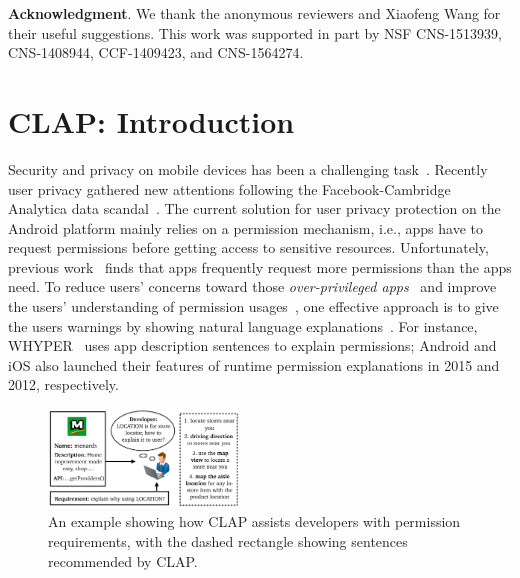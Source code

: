 \noindent \textbf{Acknowledgment}. We thank the anonymous reviewers and Xiaofeng Wang for their useful suggestions. This work was supported in part by NSF CNS-1513939, CNS-1408944,  CCF-1409423, and CNS-1564274. 


\section{CLAP: Introduction}
\label{sec:intro}

Security and privacy on mobile devices has been a challenging task~\cite{journals/tocs/EnckGHTCCJMS14,conf/ccs/FeltCHSW11,conf/soups/FeltHEHCW12,conf/huc/LinSALHZ12,conf/soups/LinLSH14,yang2015appcontext}. Recently user privacy gathered new attentions following the Facebook-Cambridge Analytica data scandal~\cite{facebookleak}. The current solution for user privacy protection on the Android platform mainly relies on a permission mechanism, i.e., apps have to request permissions before getting access to sensitive resources. 
Unfortunately, previous work~\cite{conf/ccs/FeltCHSW11} finds that apps frequently request more permissions than the apps need. 
To reduce users' concerns toward those \emph{over-privileged apps}~\cite{conf/ccs/FeltCHSW11,journals/tocs/EnckGHTCCJMS14} and improve the users' understanding of permission usages~\cite{conf/soups/ChinFSW12,conf/chi/KelleyCS13}, one effective approach is to give the users warnings by showing natural language explanations~\cite{conf/huc/LinSALHZ12}. 
For instance, WHYPER~\cite{conf/uss/PanditaXYEX13} uses app description sentences to explain permissions; Android and iOS also launched their features of runtime permission explanations in 2015 and 2012, respectively. 

\begin{figure}[t]
\centering
\includegraphics[width=0.45\textwidth]{figure/chapter2/intro-crop.pdf}
\caption{An example showing how CLAP assists developers with permission requirements, with the dashed rectangle showing sentences recommended by CLAP.}
\label{fig:intro}
\vspace{-0.2in}
\end{figure}

